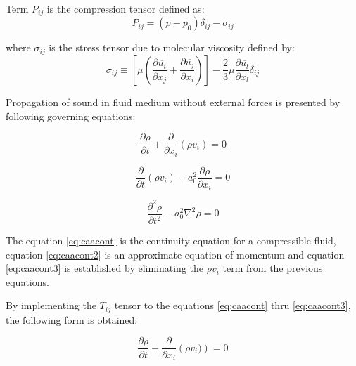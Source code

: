 Term $P_{ij}$ is the compression tensor defined as:
\begin{equation} \label{eq:Ptensor}
P_{ij} = (p - p_0)\delta_{ij} - \sigma_{ij}
\end{equation}

\noindent where $\sigma_{ij}$ is the stress tensor due to molecular viscosity defined by:
\begin{equation} \label{eq:viscstress}
\sigma_{ij}
\equiv
\left[ \mu \left( \frac{\partial \overline{u_i}}{\partial x_{j}} + \frac{\partial \overline{u_j}}{\partial x_{i}} \right) \right]
- \frac{2}{3} \mu \frac{\partial \overline{u_l}}{\partial x_l} \delta_{ij}
\end{equation}

Propagation of sound in fluid medium without external forces is presented by following governing equations:

\begin{equation} \label{eq:caacont}
\frac{\partial \rho}{\partial t} + \frac{\partial}{\partial x_i} \left( \rho v_i \right) = 0
\end{equation}

\begin{equation} \label{eq:caacont2}
\frac{\partial}{\partial t} \left(\rho v_i \right) + a_0^2\frac{\partial \rho}{\partial x_i} = 0
\end{equation}

\begin{equation} \label{eq:caacont3}
\frac{\partial^2 \rho}{\partial t^2} - a_0^2 \nabla^2 \rho = 0
\end{equation}

The equation \ref{eq:caacont} is the continuity equation for a compressible fluid, equation \ref{eq:caacont2} is an approximate equation of momentum and equation \ref{eq:caacont3} is established by eliminating the $\rho v_i$ term from the previous equations.

%
By implementing the $T_{ij}$ tensor to the equations \ref{eq:caacont} thru \ref{eq:caacont3}, the following form is obtained: 

\begin{equation} \label{eq:caacont4}
\frac{\partial \rho}{\partial t} + \frac{\partial}{\partial x_i} \left( \rho v_i) \right) = 0
\end{equation}

